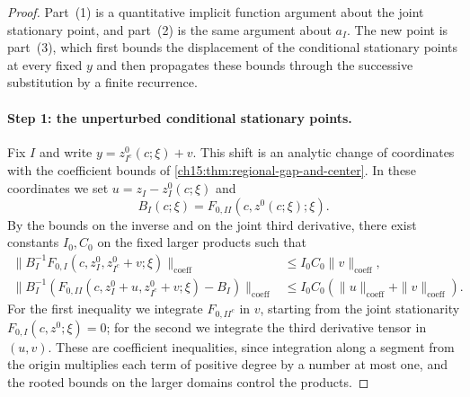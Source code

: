 \begin{proof}
Part~(1) is a quantitative implicit function argument about the joint stationary point, and part~(2) is the same argument about $a_I$. The new point is part~(3), which first bounds the displacement of the conditional stationary points at every fixed $y$ and then propagates these bounds through the successive substitution by a finite recurrence.

\paragraph{Step 1: the unperturbed conditional stationary points.}
Fix $I$ and write $y=z^0_{I^c}(c;\xi)+v$. This shift is an analytic change of coordinates with the coefficient bounds of \cref{ch15:thm:regional-gap-and-center}. In these coordinates we set $u=z_I-z_I^0(c;\xi)$ and
\[
 B_I(c;\xi)=F_{0,II}(c,z^0(c;\xi);\xi).
\]
By the bounds on the inverse and on the joint third derivative, there exist constants $I_0,C_0$ on the fixed larger products such that
\begin{align}
 \|B_I^{-1}F_{0,I}(c,z_I^0,z_{I^c}^0+v;\xi)\|_{\mathrm{coeff}}
       &\le I_0C_0\|v\|_{\mathrm{coeff}},                    \label{ch16:eq:conditional-force}\\
 \|B_I^{-1}(F_{0,II}(c,z_I^0+u,z_{I^c}^0+v;\xi)-B_I)\|_{\mathrm{coeff}}
       &\le I_0C_0(\|u\|_{\mathrm{coeff}}+\|v\|_{\mathrm{coeff}}).
                                                               \label{ch16:eq:conditional-variation}
\end{align}
For the first inequality we integrate $F_{0,II^c}$ in $v$, starting from the joint stationarity $F_{0,I}(c,z^0;\xi)=0$; for the second we integrate the third derivative tensor in $(u,v)$. These are coefficient inequalities, since integration along a segment from the origin multiplies each term of positive degree by a number at most one, and the rooted bounds on the larger domains control the products.


\end{proof}
